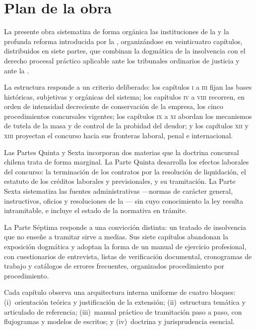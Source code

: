 \chapter*{Plan de la obra}

La presente obra sistematiza de forma orgánica las instituciones de la \LIR{} y la
profunda reforma introducida por la \Lreforma{}, organizándose en veinticuatro capítulos, distribuidos en siete partes, que
combinan la dogmática de la insolvencia con el derecho procesal práctico aplicable ante
los tribunales ordinarios de justicia y ante la \Superir{}.

La estructura responde a un criterio deliberado: los capítulos \textsc{i} a \textsc{iii}
fijan las bases históricas, subjetivas y orgánicas del sistema; los capítulos \textsc{iv}
a \textsc{viii} recorren, en orden de intensidad decreciente de conservación de la
empresa, los cinco procedimientos concursales vigentes; los capítulos \textsc{ix} a
\textsc{xi} abordan los mecanismos de tutela de la masa y de control de la probidad del
deudor; y los capítulos \textsc{xii} y \textsc{xiii} proyectan el concurso hacia sus
fronteras laboral, penal e internacional.

Las Partes Quinta y Sexta incorporan dos materias que la doctrina concursal chilena
trata de forma marginal. La Parte Quinta desarrolla los efectos laborales del concurso:
la terminación de los contratos por la resolución de liquidación, el estatuto de los
créditos laborales y previsionales, y su tramitación. La Parte Sexta sistematiza las
fuentes administrativas ---normas de carácter general, instructivos, oficios y
resoluciones de la \Superir{}--- sin cuyo conocimiento la ley resulta intramitable, e
incluye el estado de la normativa en trámite.

La Parte Séptima responde a una convicción distinta: un tratado de insolvencia que no
enseñe a tramitar sirve a medias. Sus siete capítulos abandonan la exposición dogmática y
adoptan la forma de un manual de ejercicio profesional, con cuestionarios de entrevista,
listas de verificación documental, cronogramas de trabajo y catálogos de errores
frecuentes, organizados procedimiento por procedimiento.

Cada capítulo observa una arquitectura interna uniforme de cuatro bloques:
(i)~orientación teórica y justificación de la extensión; (ii)~estructura temática y
articulado de referencia; (iii)~manual práctico de tramitación paso a paso, con
flujogramas y modelos de escritos; y (iv)~doctrina y jurisprudencia esencial.

